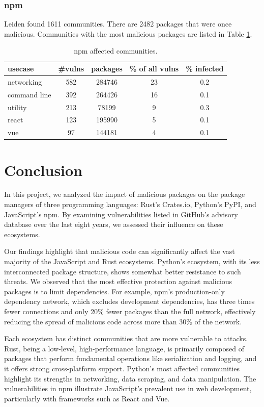 \documentclass[9pt,twocolumn,twoside]{pnas-report}
\begin{document}
\subsubsection*{npm}
Leiden found 1611 communities. There are 2482 packages that were once malicious. Communities with the most malicious packages are listed in Table \ref{tab:npm_comms}.
\begin{table}[h]\centering%
	\caption{npm affected communities.}
	\begin{tabular}{l|cccc}
		usecase      & \#vulns & packages & \% of all vulns & \% infected \\\hline
		networking   & 582     & 284746   & 23              & 0.2         \\
		command line & 392     & 264426   & 16              & 0.1         \\
		utility      & 213     & 78199    & 9               & 0.3         \\
		react        & 123     & 195990   & 5               & 0.1         \\
		vue          & 97      & 144181   & 4               & 0.1         \\
	\end{tabular}
	\label{tab:npm_comms}
\end{table}

\section*{Conclusion}

In this project, we analyzed the impact of malicious packages on the package managers of three programming languages: Rust's Crates.io, Python's PyPI, and JavaScript's npm.
By examining vulnerabilities listed in GitHub's advisory database over the last eight years, we assessed their influence on these ecosystems.

Our findings highlight that malicious code can significantly affect the vast majority of the JavaScript and Rust ecosystems.
Python's ecosystem, with its less interconnected package structure, shows somewhat better resistance to such threats.
We observed that the most effective protection against malicious packages is to limit dependencies.
For example, npm's production-only dependency network, which excludes development dependencies, has three times fewer connections and only 20\% fewer packages than the full network, effectively reducing the spread of malicious code across more than 30\% of the network.

Each ecosystem has distinct communities that are more vulnerable to attacks.
Rust, being a low-level, high-performance language, is primarily composed of packages that perform fundamental operations like serialization and logging, and it offers strong cross-platform support.
Python's most affected communities highlight its strengths in networking, data scraping, and data manipulation.
The vulnerabilities in npm illustrate JavaScript's prevalent use in web development, particularly with frameworks such as React and Vue.
\end{document}
